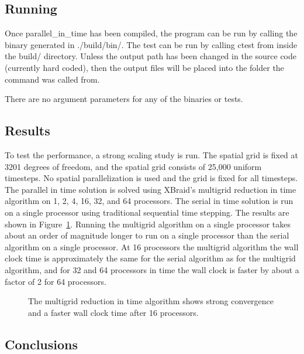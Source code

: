 \documentclass{article}
\begin{document}
\subsection{Running}\label{running}

Once parallel\_in\_time has been compiled, the program can be run by
calling the binary generated in ./build/bin/. The test can be run by
calling ctest from inside the build/ directory. Unless the output path
has been changed in the source code (currently hard coded), then the
output files will be placed into the folder the command was called from.

There are no argument parameters for any of the binaries or tests.

\subsection{Results}\label{results}

To test the performance, a strong scaling study is run. The spatial grid
is fixed at 3201 degrees of freedom, and the spatial grid consists of
25,000 uniform timesteps. No spatial parallelization is used and the
grid is fixed for all timesteps. The parallel in time solution is solved
using XBraid's multigrid reduction in time algorithm on 1, 2, 4, 16, 32,
and 64 processors. The serial in time solution is run on a single
processor using traditional sequential time stepping. The results are
shown in Figure~\ref{fig:strongscaling}. Running the multigrid algorithm on a single
processor takes about an order of magnitude longer to run on a single
processor than the serial algorithm on a single processor. At 16
processors the multigrid algorithm the wall clock time is approximately
the same for the serial algorithm as for the multigrid algorithm, and
for 32 and 64 processors in time the wall clock is faster by about a
factor of 2 for 64 processors.

\begin{figure}[htbp]
  \centering
  
  \caption{\label{fig:strongscaling}The multigrid reduction in time algorithm shows strong convergence and a faster wall clock time after 16 processors.}
\end{figure}

\subsection{Conclusions}\label{conclusions}
\end{document}
